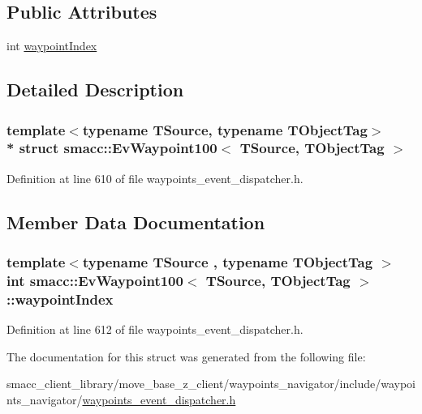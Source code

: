 \subsection*{Public Attributes}
\begin{DoxyCompactItemize}
\item 
int \hyperlink{structsmacc_1_1EvWaypoint100_a7ef685f9f871b47fe3449db08fd75a33}{waypoint\+Index}
\end{DoxyCompactItemize}


\subsection{Detailed Description}
\subsubsection*{template$<$typename T\+Source, typename T\+Object\+Tag$>$\\*
struct smacc\+::\+Ev\+Waypoint100$<$ T\+Source, T\+Object\+Tag $>$}



Definition at line 610 of file waypoints\+\_\+event\+\_\+dispatcher.\+h.



\subsection{Member Data Documentation}
\subsubsection[{\texorpdfstring{waypoint\+Index}{waypointIndex}}]{\setlength{\rightskip}{0pt plus 5cm}template$<$typename T\+Source , typename T\+Object\+Tag $>$ int {\bf smacc\+::\+Ev\+Waypoint100}$<$ T\+Source, T\+Object\+Tag $>$\+::waypoint\+Index}\hypertarget{structsmacc_1_1EvWaypoint100_a7ef685f9f871b47fe3449db08fd75a33}{}\label{structsmacc_1_1EvWaypoint100_a7ef685f9f871b47fe3449db08fd75a33}


Definition at line 612 of file waypoints\+\_\+event\+\_\+dispatcher.\+h.



The documentation for this struct was generated from the following file\+:\begin{DoxyCompactItemize}
\item 
smacc\+\_\+client\+\_\+library/move\+\_\+base\+\_\+z\+\_\+client/waypoints\+\_\+navigator/include/waypoints\+\_\+navigator/\hyperlink{waypoints__event__dispatcher_8h}{waypoints\+\_\+event\+\_\+dispatcher.\+h}\end{DoxyCompactItemize}
